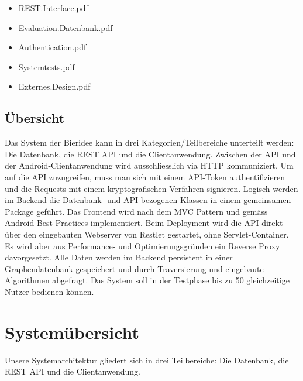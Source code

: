 \documentclass[10pt,a4paper]{scrartcl}
\begin{document}
\begin{itemize}
	\item REST.Interface.pdf
	\item Evaluation.Datenbank.pdf
	\item Authentication.pdf
	\item Systemtests.pdf
	\item Externes.Design.pdf
\end{itemize}

%
%

\subsection{Übersicht}

Das System der Bieridee kann in drei Kategorien/Teilbereiche unterteilt werden: Die Datenbank, die
REST API und die Clientanwendung. Zwischen der API und der Android-Clientanwendung wird
ausschliesslich via HTTP kommuniziert. Um auf die API zuzugreifen, muss man sich mit einem
API-Token authentifizieren und die Requests mit einem kryptografischen Verfahren signieren. 
Logisch werden im Backend die Datenbank- und API-bezogenen Klassen in einem gemeinsamen Package
geführt. Das Frontend wird nach dem MVC Pattern und gemäss Android Best Practices implementiert. 
Beim Deployment wird die API direkt über den eingebauten Webserver von Restlet gestartet, ohne
Servlet-Container. Es wird aber aus Performance- und Optimierungsgründen ein Reverse Proxy
davorgesetzt. Alle Daten werden im Backend persistent in einer Graphendatenbank gespeichert und
durch Traversierung und eingebaute Algorithmen abgefragt. Das System soll in der Testphase bis zu
50 gleichzeitige Nutzer bedienen können.


\newpage
\section{Systemübersicht}
Unsere Systemarchitektur gliedert sich in drei Teilbereiche: Die Datenbank, die REST API
und die Clientanwendung.
\end{document}
